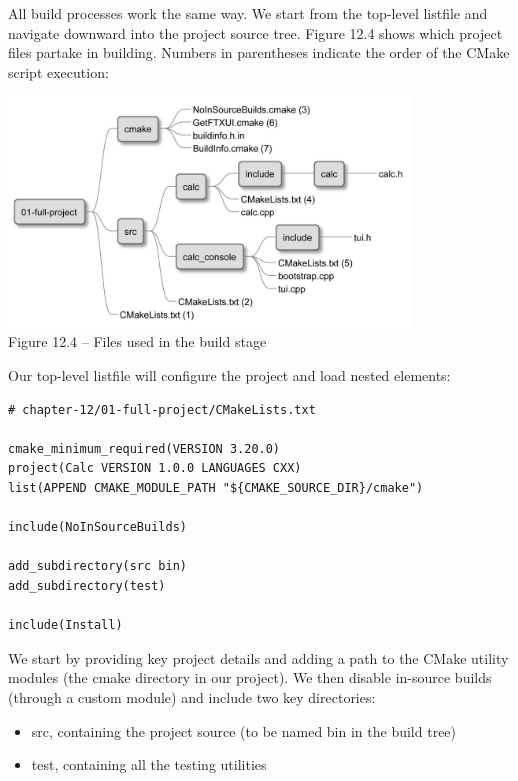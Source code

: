 
All build processes work the same way. We start from the top-level listfile and navigate downward into the project source tree. Figure 12.4 shows which project files partake in building. Numbers in parentheses indicate the order of the CMake script execution:

\begin{center}
\includegraphics[width=0.8\textwidth]{content/3/chapter12/images/4.jpg}\\
Figure 12.4 – Files used in the build stage
\end{center}

Our top-level listfile will configure the project and load nested elements:

\begin{lstlisting}[style=styleCMake]
# chapter-12/01-full-project/CMakeLists.txt

cmake_minimum_required(VERSION 3.20.0)
project(Calc VERSION 1.0.0 LANGUAGES CXX)
list(APPEND CMAKE_MODULE_PATH "${CMAKE_SOURCE_DIR}/cmake")

include(NoInSourceBuilds)

add_subdirectory(src bin)
add_subdirectory(test)

include(Install)
\end{lstlisting}

We start by providing key project details and adding a path to the CMake utility modules (the cmake directory in our project). We then disable in-source builds (through a custom module) and include two key directories:

\begin{itemize}
\item 
src, containing the project source (to be named bin in the build tree)

\item 
test, containing all the testing utilities
\end{itemize}

